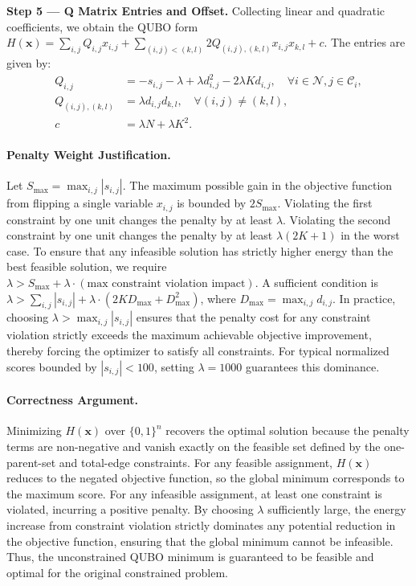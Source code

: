 \documentclass[12pt]{article}
\begin{document}
\textbf{Step 5 --- Q Matrix Entries and Offset.} Collecting linear and quadratic coefficients, we obtain the QUBO form $H(\mathbf{x}) = \sum_{i,j} Q_{i,j} x_{i,j} + \sum_{(i,j) < (k,l)} 2 Q_{(i,j),(k,l)} x_{i,j} x_{k,l} + c$. The entries are given by:
\begin{align}
    Q_{i,j} &= -s_{i,j} - \lambda + \lambda d_{i,j}^2 - 2\lambda K d_{i,j}, \quad \forall i \in \mathcal{N}, j \in \mathcal{C}_i, \\
    Q_{(i,j),(k,l)} &= \lambda d_{i,j} d_{k,l}, \quad \forall (i,j) \neq (k,l), \\
    c &= \lambda N + \lambda K^2.
\end{align}

\paragraph{Penalty Weight Justification.}
Let $S_{\max} = \max_{i,j} |s_{i,j}|$. The maximum possible gain in the objective function from flipping a single variable $x_{i,j}$ is bounded by $2 S_{\max}$. Violating the first constraint by one unit changes the penalty by at least $\lambda$. Violating the second constraint by one unit changes the penalty by at least $\lambda (2K+1)$ in the worst case. To ensure that any infeasible solution has strictly higher energy than the best feasible solution, we require $\lambda > S_{\max} + \lambda \cdot (\text{max constraint violation impact})$. A sufficient condition is $\lambda > \sum_{i,j} |s_{i,j}| + \lambda \cdot (2K D_{\max} + D_{\max}^2)$, where $D_{\max} = \max_{i,j} d_{i,j}$. In practice, choosing $\lambda > \max_{i,j} |s_{i,j}|$ ensures that the penalty cost for any constraint violation strictly exceeds the maximum achievable objective improvement, thereby forcing the optimizer to satisfy all constraints. For typical normalized scores bounded by $|s_{i,j}| < 100$, setting $\lambda = 1000$ guarantees this dominance.

\paragraph{Correctness Argument.}
Minimizing $H(\mathbf{x})$ over $\{0,1\}^n$ recovers the optimal solution because the penalty terms are non-negative and vanish exactly on the feasible set defined by the one-parent-set and total-edge constraints. For any feasible assignment, $H(\mathbf{x})$ reduces to the negated objective function, so the global minimum corresponds to the maximum score. For any infeasible assignment, at least one constraint is violated, incurring a positive penalty. By choosing $\lambda$ sufficiently large, the energy increase from constraint violation strictly dominates any potential reduction in the objective function, ensuring that the global minimum cannot be infeasible. Thus, the unconstrained QUBO minimum is guaranteed to be feasible and optimal for the original constrained problem.
\end{document}
